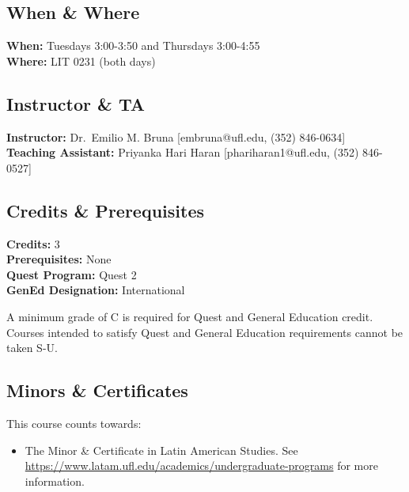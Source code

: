 \documentclass[
  10pt,
  letterpaper,
  oneside,
  open=any]{scrbook}
\providecommand{\tightlist}{%
  \setlength{\itemsep}{0pt}\setlength{\parskip}{0pt}}
\begin{document}
\subsection*{When \& Where}\label{when-where}

\textbf{When:} Tuesdays 3:00-3:50 and Thursdays 3:00-4:55\\
\textbf{Where:} LIT 0231 (both days)

\subsection*{Instructor \& TA}\label{instructor-ta}

\textbf{Instructor:} Dr.~Emilio M. Bruna {[}embruna@ufl.edu, (352)
846-0634{]}\\
\textbf{Teaching Assistant:} Priyanka Hari Haran {[}phariharan1@ufl.edu,
(352) 846-0527{]}

\subsection*{Credits \& Prerequisites}\label{credits-prerequisites}

\textbf{Credits:} 3\\
\textbf{Prerequisites:} None\\
\textbf{Quest Program:} Quest 2 \\
\textbf{GenEd Designation:} International

A minimum grade of C is required for Quest and General Education credit.
Courses intended to satisfy Quest and General Education requirements
cannot be taken S-U.

\subsection*{Minors \& Certificates}\label{minors-certificates}

This course counts towards:

\begin{itemize}
\tightlist
\item
  The Minor \& Certificate in Latin American Studies. See
  \url{https://www.latam.ufl.edu/academics/undergraduate-programs} for
  more information.
\end{itemize}
\end{document}
